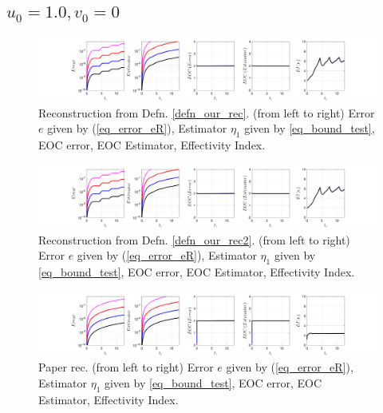 \documentclass[12pt,a4paper]{article}
\numberwithin{equation}{section}
\theoremstyle{definition}
\begin{document}
\subsection*{$u_0=1.0, v_0= 0$}
\begin{figure}[H]
	\hspace{-3cm}
	\includegraphics[scale=0.55]{fig_LeapFrogplots_1x5_sin_IC_harmonic_order_2_u10_v0_rec_george}	
	\caption{Reconstruction from Defn. \ref{defn_our_rec}. (from left to right) Error $e$ given by (\ref{eq_error_eR}), Estimator $\eta_1$ given by \ref{eq_bound_test},  EOC error, EOC Estimator, Effectivity Index.}
	\label{fig_all_in_one_our_rec_george_u10_v0}
\end{figure}
\begin{figure}[H]
	\hspace{-3cm}
	\includegraphics[scale=0.55]{fig_LeapFrogplots_1x5_sin_IC_harmonic_order_2_u10_v0_rec2}	
	\caption{Reconstruction from Defn. \ref{defn_our_rec2}. (from left to right) Error $e$ given by (\ref{eq_error_eR}), Estimator $\eta_1$ given by \ref{eq_bound_test},   EOC error, EOC Estimator, Effectivity Index.}
	\label{fig_all_in_one_our_rec_2_u10_v0}
\end{figure}
\begin{figure}[H]
	\hspace{-3cm}
	\includegraphics[scale=0.55]{fig_LeapFrogplots_1x5_sin_IC_harmonic_u10_v0_paperrec}	
	\caption{Paper rec. (from left to right) Error $e$ given by (\ref{eq_error_eR}), Estimator $\eta_1$ given by \ref{eq_bound_test}, EOC error, EOC Estimator, Effectivity Index.}
	\label{fig_all_in_one_paperrec_u10_v1}
\end{figure}
\end{document}
